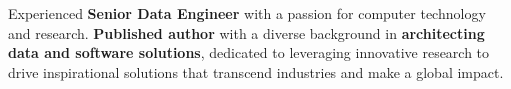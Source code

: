 

\begin{cvparagraph}
Experienced \textbf{Senior Data Engineer} with a passion for computer technology and research. \textbf{Published author} with a diverse background in \textbf{architecting data and software solutions}, dedicated to leveraging innovative research to drive inspirational solutions that transcend industries and make a global impact.
\end{cvparagraph}
